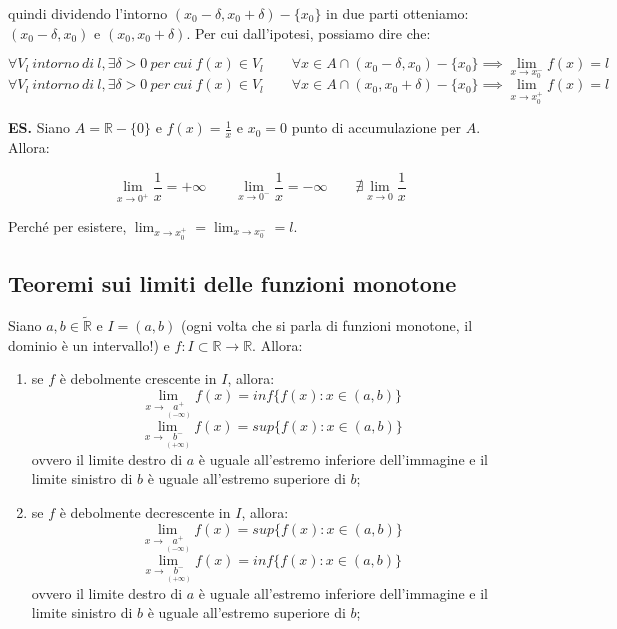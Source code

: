 \documentclass{article}
\begin{document}
\noindent quindi dividendo l'intorno $(x_0 - \delta, x_0 + \delta) - \{x_0\}$ in due parti otteniamo: $(x_0 - \delta, x_0)$ e $(x_0, x_0 + \delta)$. Per cui dall'ipotesi, possiamo dire che:

\begin{equation*}
    \forall V_l \ intorno \ di \ l, \exists \delta > 0 \ per \ cui \ f(x) \in V_l \qquad \forall x \in A \cap (x_0 - \delta, x_0) - \{x_0\} \implies \lim_{x \to x^-_0} f(x) = l
\end{equation*}
\begin{equation*}
    \forall V_l \ intorno \ di \ l, \exists \delta > 0 \ per \ cui \ f(x) \in V_l \qquad \forall x \in A \cap (x_0, x_0 + \delta) - \{x_0\} \implies \lim_{x \to x^+_0} f(x) = l
\end{equation*}

\noindent\textbf{ES.} Siano $A = \mathbb{R} - \{0\}$ e $f(x) = \frac{1}{x}$ e $x_0 = 0$ punto di accumulazione per $A$. Allora:

\begin{equation*}
    \lim_{x \to 0^+} \frac{1}{x} = +\infty \qquad \lim_{x \to 0^-} \frac{1}{x} = -\infty \qquad \nexists\lim_{x \to 0} \frac{1}{x} 
\end{equation*}

\noindent Perché per esistere, $\lim_{x \to x^+_0} = \lim_{x \to x^-_0} = l$.

\subsection{Teoremi sui limiti delle funzioni monotone}
Siano $a, b \in \widetilde{\mathbb{R}}$ e $I = (a, b)$ (ogni volta che si parla di funzioni monotone, il dominio è un intervallo!) e $f: I \subset \mathbb{R} \xrightarrow{} \mathbb{R}$. Allora:

\begin{enumerate}[label=\alph{enumi})]
    \item se $f$ è debolmente crescente in $I$, allora: $$\lim_{x \to \underset{\scriptstyle (-\infty)}{a^+}} f(x) = inf\{f(x) : x \in (a, b)\}$$ $$\lim_{x \to \underset{\scriptstyle (+\infty)}{b^-}} f(x) = sup\{f(x) : x \in (a, b)\}$$ ovvero il limite destro di $a$ è uguale all'estremo inferiore dell'immagine e il limite sinistro di $b$ è uguale all'estremo superiore di $b$;
    \item se $f$ è debolmente decrescente in $I$, allora: $$\lim_{x \to \underset{\scriptstyle (-\infty)}{a^+}} f(x) = sup\{f(x) : x \in (a, b)\}$$ $$\lim_{x \to \underset{\scriptstyle (+\infty)}{b^-}} f(x) = inf\{f(x) : x \in (a, b)\}$$ ovvero il limite destro di $a$ è uguale all'estremo inferiore dell'immagine e il limite sinistro di $b$ è uguale all'estremo superiore di $b$;
\end{enumerate}
\end{document}
